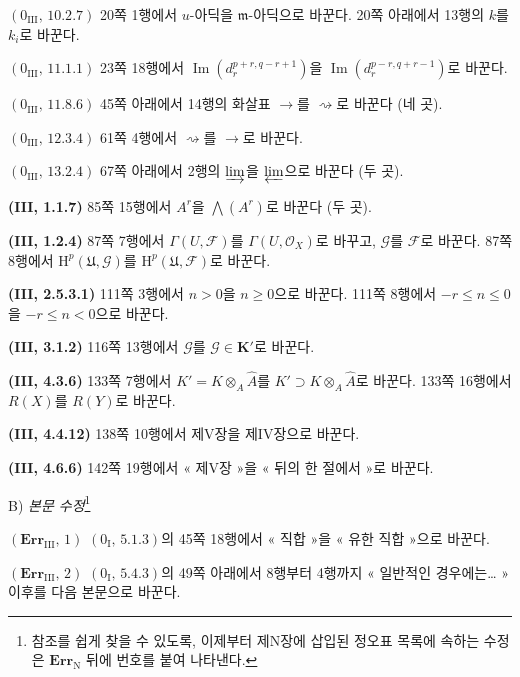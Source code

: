 \noindent\textbf{$(0_{\mathrm{III}},\,10.2.7)$} 20쪽 1행에서
$u$-아딕을 $\mathfrak m$-아딕으로 바꾼다. 20쪽 아래에서 13행의
$k$를 $k_i$로 바꾼다.

\noindent\textbf{$(0_{\mathrm{III}},\,11.1.1)$} 23쪽 18행에서
$\operatorname{Im}(d_r^{p+r,q-r+1})$을
$\operatorname{Im}(d_r^{p-r,q+r-1})$로 바꾼다.

\noindent\textbf{$(0_{\mathrm{III}},\,11.8.6)$} 45쪽 아래에서 14행의
화살표 $\to$를 $\rightsquigarrow$로 바꾼다 (네 곳).

\noindent\textbf{$(0_{\mathrm{III}},\,12.3.4)$} 61쪽 4행에서
$\rightsquigarrow$를 $\to$로 바꾼다.

\noindent\textbf{$(0_{\mathrm{III}},\,13.2.4)$} 67쪽 아래에서 2행의
$\varinjlim$을 $\varprojlim$으로 바꾼다 (두 곳).

\noindent\textbf{(III, 1.1.7)} 85쪽 15행에서 $A^r$을
$\bigwedge(A^r)$로 바꾼다 (두 곳).

\noindent\textbf{(III, 1.2.4)} 87쪽 7행에서
$\Gamma(U,\mathscr F)$를 $\Gamma(U,\mathscr O_X)$로 바꾸고,
$\mathscr G$를 $\mathscr F$로 바꾼다. 87쪽 8행에서
$\mathrm H^p(\mathfrak U,\mathscr G)$를
$\mathrm H^p(\mathfrak U,\mathscr F)$로 바꾼다.

\noindent\textbf{(III, 2.5.3.1)} 111쪽 3행에서 $n>0$을
$n\geq0$으로 바꾼다. 111쪽 8행에서 $-r\leq n\leq0$을
$-r\leq n<0$으로 바꾼다.

\noindent\textbf{(III, 3.1.2)} 116쪽 13행에서 $\mathscr G$를
$\mathscr G\in\mathbf K'$로 바꾼다.

\noindent\textbf{(III, 4.3.6)} 133쪽 7행에서
$K'=K\otimes_A\widehat A$를 $K'\supset K\otimes_A\widehat A$로
바꾼다. 133쪽 16행에서 $R(X)$를 $R(Y)$로 바꾼다.

\noindent\textbf{(III, 4.4.12)} 138쪽 10행에서 제V장을 제IV장으로
바꾼다.

\noindent\textbf{(III, 4.6.6)} 142쪽 19행에서 « 제V장 »을
« 뒤의 한 절에서 »로 바꾼다.

\begin{center}
B) \emph{본문 수정}\footnote{참조를 쉽게 찾을 수 있도록, 이제부터
제N장에 삽입된 정오표 목록에 속하는 수정은 $\mathbf{Err}_{\mathrm N}$
뒤에 번호를 붙여 나타낸다.}
\end{center}

\noindent\textbf{$(\mathbf{Err}_{\mathrm{III}},\,1)$}
$(0_{\mathrm I},\,5.1.3)$의 45쪽 18행에서 « 직합 »을 « 유한 직합 »으로
바꾼다.

\noindent\textbf{$(\mathbf{Err}_{\mathrm{III}},\,2)$}
$(0_{\mathrm I},\,5.4.3)$의 49쪽 아래에서 8행부터 4행까지
« 일반적인 경우에는\ldots{} » 이후를 다음 본문으로 바꾼다.

